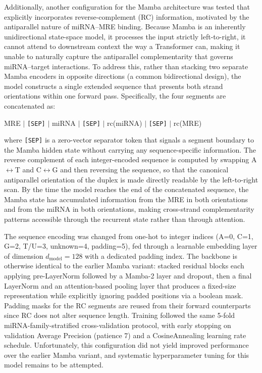 \documentclass[en,ack]{dimscthesis}
\begin{document}
Additionally, another configuration for the Mamba architecture was tested that explicitly incorporates reverse-complement (RC) information, motivated by the antiparallel nature of miRNA–MRE binding. Because Mamba is an inherently unidirectional state-space model, it processes the input strictly left-to-right, it cannot attend to downstream context the way a Transformer can, making it unable to naturally capture the antiparallel complementarity that governs miRNA–target interactions. To address this, rather than stacking two separate Mamba encoders in opposite directions (a common bidirectional design), the model constructs a single extended sequence that presents both strand orientations within one forward pass. Specifically, the four segments are concatenated as:

\begin{center}
MRE $\mid$ \texttt{[SEP]} $\mid$ miRNA $\mid$ \texttt{[SEP]} $\mid$ rc(miRNA) $\mid$ \texttt{[SEP]} $\mid$ rc(MRE)
\end{center}

where \texttt{[SEP]} is a zero-vector separator token that signals a segment boundary to the Mamba hidden state without carrying any sequence-specific information. The reverse complement of each integer-encoded sequence is computed by swapping A$\leftrightarrow$T and C$\leftrightarrow$G and then reversing the sequence, so that the canonical antiparallel orientation of the duplex is made directly readable by the left-to-right scan. By the time the model reaches the end of the concatenated sequence, the Mamba state has accumulated information from the MRE in both orientations and from the miRNA in both orientations, making cross-strand complementarity patterns accessible through the recurrent state rather than through attention.

The sequence encoding was changed from one-hot to integer indices (A=0, C=1, G=2, T/U=3, unknown=4, padding=5), fed through a learnable embedding layer of dimension $d_{\text{model}}=128$ with a dedicated padding index. The backbone is otherwise identical to the earlier Mamba variant: stacked residual blocks each applying pre-LayerNorm followed by a Mamba-2 layer and dropout, then a final LayerNorm and an attention-based pooling layer that produces a fixed-size representation while explicitly ignoring padded positions via a boolean mask. Padding masks for the RC segments are reused from their forward counterparts since RC does not alter sequence length. Training followed the same 5-fold miRNA-family-stratified cross-validation protocol, with early stopping on validation Average Precision (patience 7) and a CosineAnnealing learning rate schedule. Unfortunately, this configuration did not yield improved performance over the earlier Mamba variant, and systematic hyperparameter tuning for this model remains to be attempted.
\end{document}
